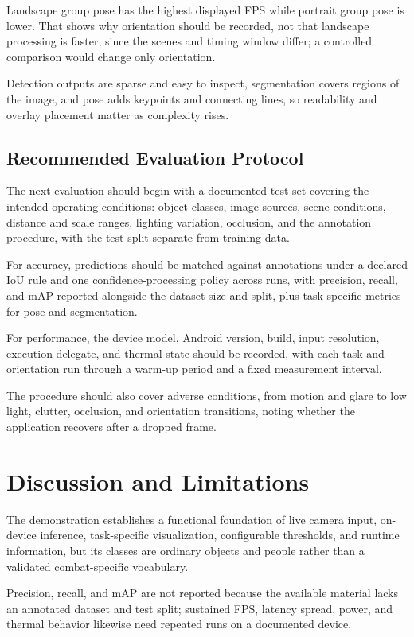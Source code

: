 Landscape group pose has the highest displayed FPS while portrait group pose is lower. That shows why
orientation should be recorded, not that landscape processing is faster, since the scenes and timing
window differ; a controlled comparison would change only orientation.

Detection outputs are sparse and easy to inspect, segmentation covers regions of the image, and pose
adds keypoints and connecting lines, so readability and overlay placement matter as complexity rises.

\label{end:runtime}
\subsection{Recommended Evaluation Protocol}
The next evaluation should begin with a documented test set covering the intended operating
conditions: object classes, image sources, scene conditions, distance and scale ranges, lighting
variation, occlusion, and the annotation procedure, with the test split separate from training data.

For accuracy, predictions should be matched against annotations under a declared IoU rule and one
confidence-processing policy across runs, with precision, recall, and mAP reported alongside the
dataset size and split, plus task-specific metrics for pose and segmentation.

For performance, the device model, Android version, build, input resolution, execution delegate, and
thermal state should be recorded, with each task and orientation run through a warm-up period and a
fixed measurement interval.

The procedure should also cover adverse conditions, from motion and glare to low light, clutter,
occlusion, and orientation transitions, noting whether the application recovers after a dropped frame.

\section{Discussion and Limitations}\label{sec:discussion}
The demonstration establishes a functional foundation of live camera input, on-device inference,
task-specific visualization, configurable thresholds, and runtime information, but its classes are
ordinary objects and people rather than a validated combat-specific vocabulary.

Precision, recall, and mAP are not reported because the available material lacks an annotated dataset
and test split; sustained FPS, latency spread, power, and thermal behavior likewise need repeated runs
on a documented device.

